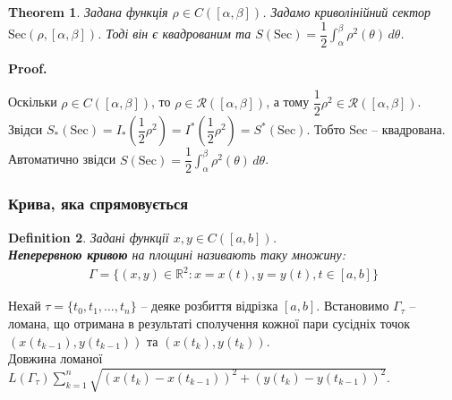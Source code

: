 \documentclass[a4paper, 10pt]{article}
\makeatletter
\def\huge{\displaystyle}
\theoremstyle{theoremdd}
\newtheorem{theorem}{Theorem}[subsection]
\theoremstyle{theoremdd}
\theoremstyle{theoremdd}
\newtheorem{definition}[theorem]{Definition}
\theoremstyle{theoremdd}
\theoremstyle{theoremdd}
\theoremstyle{theoremdd}
\theoremstyle{theoremdd}
\theoremstyle{theoremdd}
\theoremstyle{theoremdd}
\renewenvironment{proof}[1][Proof.\\]{\par
\pushQED{\hfill \qed}%
\normalfont \topsep6\p@\@plus6\p@\relax
\trivlist
\item\relax
{\bfseries
#1\@addpunct{.}}\hspace\labelsep\ignorespaces
}{%
\popQED\endtrivlist\@endpefalse
}
\makeatother
\begin{document}
\begin{theorem}
Задана функція $\rho \in C([\alpha,\beta])$. Задамо криволінійний сектор $\text{Sec}(\rho, [\alpha,\beta])$. Тоді він є квадрованим та $S(\text{Sec}) = \dfrac{1}{2} \huge\int_\alpha^\beta \rho^2(\theta) \,d\theta$.
\end{theorem}

\begin{proof}
Оскільки $\rho \in C([\alpha,\beta])$, то $\rho \in \mathcal{R}([\alpha,\beta])$, а тому $\dfrac{1}{2}\rho^2 \in \mathcal{R}([\alpha,\beta])$. Звідси $S_*(\text{Sec}) = I_*\left( \dfrac{1}{2} \rho^2 \right) = I^*\left( \dfrac{1}{2} \rho^2 \right) = S^*(\text{Sec})$. Тобто $\text{Sec}$ -- квадрована.\\
Автоматично звідси $S(\text{Sec}) = \dfrac{1}{2} \huge\int_\alpha^\beta \rho^2(\theta) \, d\theta$.
\end{proof}

\subsubsection{Крива, яка спрямовується}
\begin{definition}
Задані функції $x,y \in C([a,b])$.\\
\textbf{Неперервною кривою} на площині називають таку множину:
\begin{align*}
\Gamma = \{ (x,y) \in \mathbb{R}^2 : x = x(t), y = y(t), t \in [a,b] \}
\end{align*}
\end{definition}
Нехай $\tau = \{t_0,t_1,\dots,t_n\}$ -- деяке розбиття відрізка $[a,b]$. Встановимо $\Gamma_\tau$ -- ломана, що отримана в результаті сполучення кожної пари сусідніх точок $(x(t_{k-1}), y(t_{k-1}))$ та $(x(t_{k}),y(t_{k}))$.\\
Довжина ломаної $L(\Gamma_\tau) \huge\sum_{k=1}^n \sqrt{(x(t_{k})-x(t_{k-1}))^2 + (y(t_{k})-y(t_{k-1}))^2}$.
\begin{figure}[H]
\centering
{}
\end{figure}
\end{document}
